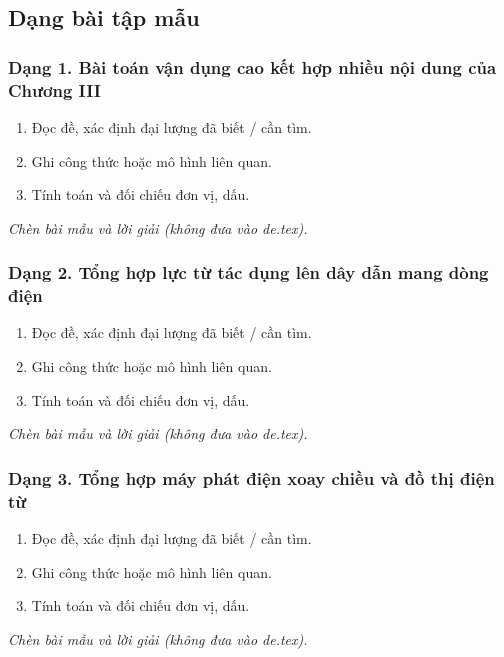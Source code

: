 

\subsection{Dạng bài tập mẫu}
\subsubsection{Dạng 1. Bài toán vận dụng cao kết hợp nhiều nội dung của Chương III}
\begin{phuongphap}
\begin{enumerate}
\item Đọc đề, xác định đại lượng đã biết / cần tìm.
\item Ghi công thức hoặc mô hình liên quan.
\item Tính toán và đối chiếu đơn vị, dấu.
\end{enumerate}
\end{phuongphap}
\begin{vidumau}
\textit{Chèn bài mẫu và lời giải (không đưa vào de.tex).}
\end{vidumau}

\subsubsection{Dạng 2. Tổng hợp lực từ tác dụng lên dây dẫn mang dòng điện}
\begin{phuongphap}
\begin{enumerate}
\item Đọc đề, xác định đại lượng đã biết / cần tìm.
\item Ghi công thức hoặc mô hình liên quan.
\item Tính toán và đối chiếu đơn vị, dấu.
\end{enumerate}
\end{phuongphap}
\begin{vidumau}
\textit{Chèn bài mẫu và lời giải (không đưa vào de.tex).}
\end{vidumau}

\subsubsection{Dạng 3. Tổng hợp máy phát điện xoay chiều và đồ thị điện từ}
\begin{phuongphap}
\begin{enumerate}
\item Đọc đề, xác định đại lượng đã biết / cần tìm.
\item Ghi công thức hoặc mô hình liên quan.
\item Tính toán và đối chiếu đơn vị, dấu.
\end{enumerate}
\end{phuongphap}
\begin{vidumau}
\textit{Chèn bài mẫu và lời giải (không đưa vào de.tex).}
\end{vidumau}

